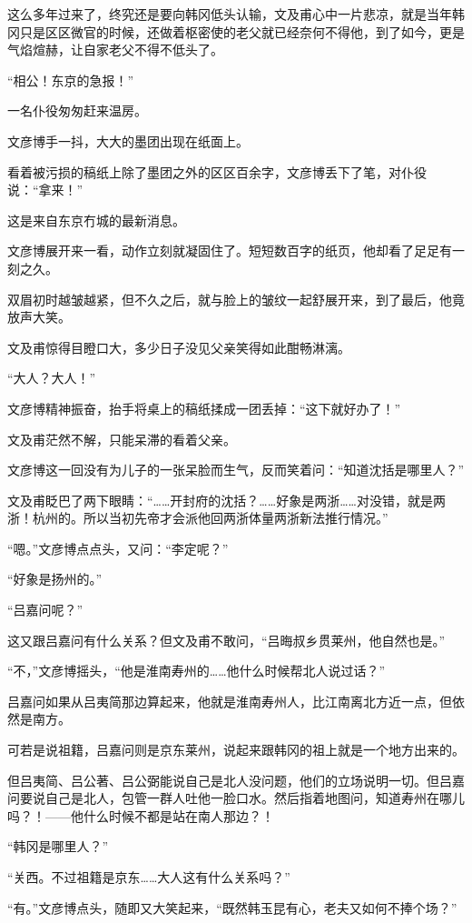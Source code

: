 这么多年过来了，终究还是要向韩冈低头认输，文及甫心中一片悲凉，就是当年韩冈只是区区微官的时候，还做着枢密使的老父就已经奈何不得他，到了如今，更是气焰煊赫，让自家老父不得不低头了。

“相公！东京的急报！”

一名仆役匆匆赶来温房。

文彦博手一抖，大大的墨团出现在纸面上。

看着被污损的稿纸上除了墨团之外的区区百余字，文彦博丢下了笔，对仆役说：“拿来！”

这是来自东京冇城的最新消息。

文彦博展开来一看，动作立刻就凝固住了。短短数百字的纸页，他却看了足足有一刻之久。

双眉初时越皱越紧，但不久之后，就与脸上的皱纹一起舒展开来，到了最后，他竟放声大笑。

文及甫惊得目瞪口大，多少日子没见父亲笑得如此酣畅淋漓。

“大人？大人！”

文彦博精神振奋，抬手将桌上的稿纸揉成一团丢掉：“这下就好办了！”

文及甫茫然不解，只能呆滞的看着父亲。

文彦博这一回没有为儿子的一张呆脸而生气，反而笑着问：“知道沈括是哪里人？”

文及甫眨巴了两下眼睛：“……开封府的沈括？……好象是两浙……对没错，就是两浙！杭州的。所以当初先帝才会派他回两浙体量两浙新法推行情况。”

“嗯。”文彦博点点头，又问：“李定呢？”

“好象是扬州的。”

“吕嘉问呢？”

这又跟吕嘉问有什么关系？但文及甫不敢问，“吕晦叔乡贯莱州，他自然也是。”

“不，”文彦博摇头，“他是淮南寿州的……他什么时候帮北人说过话？”

吕嘉问如果从吕夷简那边算起来，他就是淮南寿州人，比江南离北方近一点，但依然是南方。

可若是说祖籍，吕嘉问则是京东莱州，说起来跟韩冈的祖上就是一个地方出来的。

但吕夷简、吕公著、吕公弼能说自己是北人没问题，他们的立场说明一切。但吕嘉问要说自己是北人，包管一群人吐他一脸口水。然后指着地图问，知道寿州在哪儿吗？！——他什么时候不都是站在南人那边？！

“韩冈是哪里人？”

“关西。不过祖籍是京东……大人这有什么关系吗？”

“有。”文彦博点头，随即又大笑起来，“既然韩玉昆有心，老夫又如何不捧个场？”

